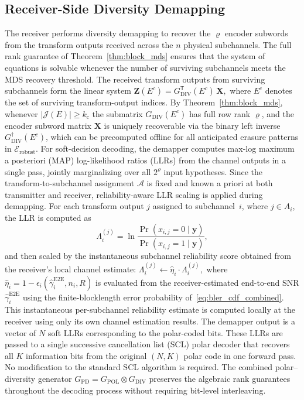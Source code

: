 \documentclass[journal]{IEEEtran}
\begin{document}
\subsection{Receiver-Side Diversity Demapping}
\label{subsec:receiver_demapping}
The receiver performs diversity demapping to recover the $\varrho$ encoder subwords from the transform outputs received across the $n$ physical subchannels. The full rank guarantee of Theorem~\ref{thm:block_mds} ensures that the system of equations is solvable whenever the number of surviving subchannels meets the MDS recovery threshold. The received transform outputs from surviving subchannels form the linear system $
\mathbf{Z}(E^c) = G_{\mathrm{DIV}}^{\mathsf{T}}(E^c)\,\mathbf{X},
$ where $E^c$ denotes the set of surviving transform-output indices. By Theorem~\ref{thm:block_mds}, whenever $|\mathcal{J}(E)| \geq k_{\mathrm{c}}$ the submatrix $G_{\mathrm{DIV}}(E^c)$ has full row rank $\varrho$, and the encoder subword matrix $\mathbf{X}$ is uniquely recoverable via the binary left inverse $G_{\mathrm{DIV}}^{\dagger}(E^c)$, which can be precomputed offline for all anticipated erasure patterns in $\mathcal{E}_{\mathrm{robust}}$. For soft-decision decoding, the demapper computes max-log maximum a posteriori (MAP) log-likelihood ratios (LLRs) from the channel outputs in a single pass, jointly marginalizing over all $2^{\varrho}$ input hypotheses. Since the transform-to-subchannel assignment $\mathcal{A}$ is fixed and known a priori at both transmitter and receiver, reliability-aware LLR scaling is applied during demapping. For each transform output $j$ assigned to subchannel~$i$, where $j \in A_i$, the LLR is computed as \begin{equation}
    \Lambda_i^{(j)} = \ln \frac{\Pr(x_{i,j}=0 \mid \mathbf{y})}{\Pr(x_{i,j}=1 \mid \mathbf{y})},
\end{equation}
and then scaled by the instantaneous subchannel reliability score obtained from the receiver's local channel estimate: $
\Lambda_i^{(j)} \leftarrow \hat{\eta}_i \cdot \Lambda_i^{(j)},$
where $\hat{\eta}_i = 1 - \epsilon_i(\hat{\gamma}_i^{\mathrm{E2E}}, n_i, R)$ is evaluated from the receiver-estimated end-to-end SNR $\hat{\gamma}_i^{\mathrm{E2E}}$ using the finite-blocklength error probability of~\eqref{eq:bler_cdf_combined}. This instantaneous per-subchannel reliability estimate is computed locally at the receiver using only its own channel estimation results. The demapper output is a vector of $N$ soft LLRs corresponding to the polar-coded bits. These LLRs are passed to a single successive cancellation list (SCL) polar decoder that recovers all $K$ information bits from the original $(N,K)$ polar code in one forward pass. No modification to the standard SCL algorithm is required. The combined polar--diversity generator $G_{\mathrm{PD}} = G_{\mathrm{POL}} \otimes G_{\mathrm{DIV}}$ preserves the algebraic rank guarantees throughout the decoding process without requiring bit-level interleaving.
\end{document}
